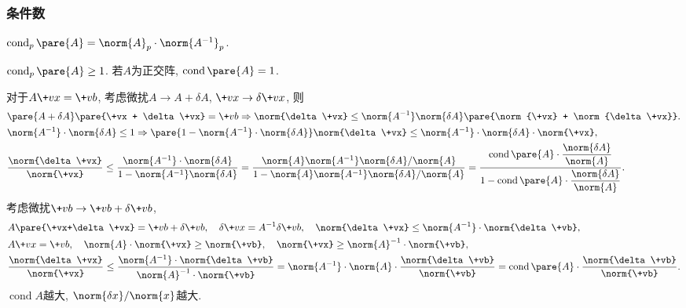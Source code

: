 \documentclass[hidelinks]{ctexart}
\DeclareMathOperator{\cond}{cond}
\begin{document}

\subsubsection{条件数} %
\label{ssub:条件数}

\begin{definition}
    $\cond_p\pare{A} = \norm{A}_p \cdot \norm{A^{-1}}_p$.
\end{definition}
$\cond_p\pare{A}\ge 1$. 若$A$为正交阵, $\cond\pare{A} = 1$.
\par
对于$A\+vx = \+vb$, 考虑微扰$A \rightarrow A+\delta A$, $\+vx \rightarrow \delta \+vx$, 则
\begin{align*}
    & \pare{A+\delta A}\pare{\+vx + \delta \+vx} = \+vb\Rightarrow \norm{\delta \+vx} \le \norm{A^{-1}}\norm{\delta A}\pare{\norm{\+vx} + \norm{\delta \+vx}}. \\
    & \norm{A^{-1}} \cdot \norm{\delta A}\le 1 \Rightarrow \pare{1-\norm{A^{-1}} \cdot \norm{\delta A}}\norm{\delta \+vx} \le \norm{A^{-1}}\cdot \norm{\delta A}\cdot \norm{\+vx}, \\
    & \frac{\norm{\delta \+vx}}{\norm{\+vx}} \le \frac{\norm{A^{-1}}\cdot \norm{\delta A}}{1-\norm{A^{-1}}\norm{\delta A}} = \frac{\norm{A}\norm{A^{-1}} \norm{\delta A}/\norm{A}}{1-\norm{A}\norm{A^{-1}} \norm{\delta A}/\norm{A}} = \frac{\displaystyle \cond \pare{A}\cdot \frac{\norm{\delta A}}{\norm{A}}}{\displaystyle 1-\cond\pare{A}\cdot \frac{\norm{\delta A}}{\norm{A}}}.
\end{align*}
考虑微扰$\+vb \rightarrow \+vb+\delta \+vb$,
\begin{align*}
    & A\pare{\+vx+\delta \+vx} = \+vb + \delta \+vb,\quad \delta \+vx = A^{-1}\delta \+vb,\quad \norm{\delta \+vx} \le \norm{A^{-1}}\cdot \norm{\delta \+vb}, \\
    & A \+vx = \+vb,\quad \norm{A}\cdot \norm{\+vx} \ge \norm{\+vb},\quad \norm{\+vx} \ge \norm{A}^{-1}\cdot \norm{\+vb}, \\
    & \frac{\norm{\delta \+vx}}{\norm{\+vx}} \le \frac{\norm{A^{-1}}\cdot \norm{\delta \+vb}}{\norm{A}^{-1}\cdot \norm{\+vb}} = \norm{A^{-1}} \cdot \norm{A} \cdot \frac{\norm{\delta \+vb}}{\norm{\+vb}} = \cond \pare{A} \cdot \frac{\norm{\delta \+vb}}{\norm{\+vb}}.
\end{align*}
$\cond A$越大, $\norm{\delta x}/\norm{x}$越大.
\end{document}
